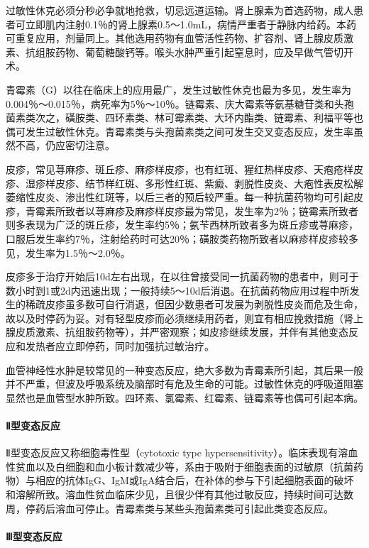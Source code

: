 过敏性休克必须分秒必争就地抢救，切忌远道运输。肾上腺素为首选药物，成人患者可立即肌内注射0.1％的肾上腺素0.5～1.0mL，病情严重者于静脉内给药。本药可重复应用，剂量同上。其他选用药物有血管活性药物、扩容剂、肾上腺皮质激素、抗组胺药物、葡萄糖酸钙等。喉头水肿严重引起窒息时，应及早做气管切开术。

青霉素（G）以往在临床上的应用最广，发生过敏性休克也最为多见，发生率为0.004％～0.015％，病死率为5％～10％。链霉素、庆大霉素等氨基糖苷类和头孢菌素类次之，磺胺类、四环素类、林可霉素类、大环内酯类、链霉素、利福平等也偶可发生过敏性休克。青霉素类与头孢菌素类之间可发生交叉变态反应，发生率虽然不高，仍应密切注意。

皮疹，常见荨麻疹、斑丘疹、麻疹样皮疹，也有红斑、猩红热样皮疹、天疱疮样皮疹、湿疹样皮疹、结节样红斑、多形性红斑、紫癜、剥脱性皮炎、大疱性表皮松解萎缩性皮炎、渗出性红斑等，以后三者的预后较严重。每一种抗菌药物均可引起皮疹，青霉素所致者以荨麻疹及麻疹样皮疹最为常见，发生率为2％；链霉素所致者则多表现为广泛的斑丘疹，发生率约5％；氨苄西林所致者多为斑丘疹或荨麻疹，口服后发生率约7％，注射给药时可达20％；磺胺类药物所致者以麻疹样皮疹较多见，发生率为1.5％～2.0％。

皮疹多于治疗开始后10d左右出现，在以往曾接受同一抗菌药物的患者中，则可于数小时到1或2d内迅速出现；一般持续5～10d后消退。在抗菌药物应用过程中所发生的稀疏皮疹虽多数可自行消退，但因少数患者可发展为剥脱性皮炎而危及生命，故以及时停药为妥。对有轻型皮疹而必须继续用药者，则宜有相应挽救措施（肾上腺皮质激素、抗组胺药物等），并严密观察；如皮疹继续发展，并伴有其他变态反应和发热者应立即停药，同时加强抗过敏治疗。

血管神经性水肿是较常见的一种变态反应，绝大多数为青霉素所引起，其后果一般并不严重，但波及呼吸系统及脑部时有危及生命的可能。过敏性休克的呼吸道阻塞显然也是血管型水肿所致。四环素、氯霉素、红霉素、链霉素等也偶可引起本病。
\paragraph{Ⅱ型变态反应}

Ⅱ型变态反应又称细胞毒性型（cytotoxic type
hypersensitivity）。临床表现有溶血性贫血以及白细胞和血小板计数减少等，系由于吸附于细胞表面的过敏原（抗菌药物）与相应的抗体IgG、IgM或IgA结合后，在补体的参与下引起细胞表面的破坏和溶解所致。溶血性贫血临床少见，且很少伴有其他过敏反应，持续时间可达数周，停药后溶血可停止。青霉素类与某些头孢菌素类可引起此类变态反应。
\paragraph{Ⅲ型变态反应}

